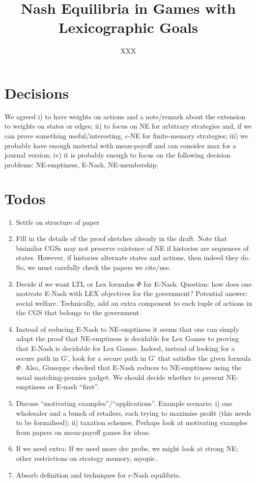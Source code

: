 \documentclass{article}
\title{Nash Equilibria in Games with Lexicographic Goals}
\author{XXX}
\begin{document}
\section*{Decisions}

We agreed i) to have weights on actions and a note/remark about the extension to weights on states or edges; ii) to focus on NE for arbitrary strategies and, if we can prove something useful/interesting, $\epsilon$-NE for finite-memory strategies; iii) we probably have enough material with mean-payoff and can consider max for a journal version; iv) it is probably enough to focus on the following decision problems: NE-emptiness, E-Nash, NE-membership.


\section*{Todos}

\begin{enumerate}
 \item Settle on structure of paper

 \item Fill in the details of the proof sketches already in the draft. Note that bisimilar CGSs may not preserve existence of NE if histories are sequences of states. However, if histories alternate states and actions, then indeed they do. So, we must carefully check the papers we cite/use.

 \item Decide if we want LTL or Lex formulas $\Phi$ for E-Nash. Question: how does one motivate E-Nash with LEX objectives for the government? Potential answer: social welfare. Technically, add an extra component to each tuple of actions in the CGS that belongs to the government.
  
 \item Instead of reducing E-Nash to NE-emptiness it seems that one can simply adapt the proof that NE-emptiness is decidable for Lex Games to proving that E-Nash is decidable for Lex Games. Indeed, instead of looking for a secure path in G', look for a secure path in G' that satisfies the given formula $\Phi$. Also, Giuseppe 
checked that E-Nash reduces to NE-emptiness using the usual matching-pennies gadget. We should decide whether to present NE-emptiness or E-nash ``first''.


 \item Discuss ``motivating examples''/``applications''.  Example scenario: i) one wholesaler and a bunch of retailers, each trying to maximise profit (this needs to be formalised); ii) taxation schemes. Perhaps look at motivating examples from papers on mean-payoff games for ideas.
 
 \item If we need extra: If we need more dec probs, we might look at strong NE; other restrictions on strategy memory, myopic.
 
 \item Absorb definition and techniques for $\epsilon$-Nash equilibria.
\end{enumerate}
\end{document}
